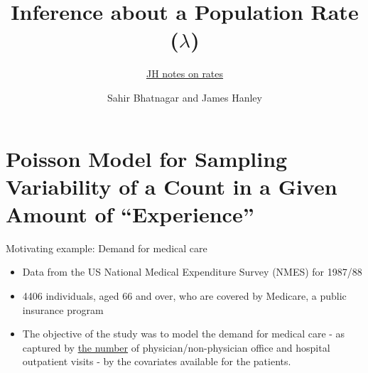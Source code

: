 \documentclass{beamer}\usepackage[]{graphicx}\usepackage[]{color}
\begin{document}




\title{Inference about a Population Rate ($\lambda$)}
\subtitle{\href{https://www.dropbox.com/s/b5q7vqo2ev6k2me/EPIB607intensity-model-inference-plan-2018.pdf?dl=0}{JH notes on rates}}
\author{Sahir Bhatnagar and James Hanley}


\maketitle

\section{Poisson Model for Sampling Variability of a Count in a Given Amount of ``Experience''}

\begin{frame}{Motivating example: Demand for medical care}

\begin{itemize}
	\setlength\itemsep{1em}
	\item Data from the US National Medical	Expenditure Survey (NMES) for 1987/88
	\item 4406 individuals, aged 66 and over, who are covered by Medicare, a public insurance program
	\item The objective of the study was to model the demand for medical care - as captured by \underline{the number} of physician/non-physician office and hospital outpatient visits - by the covariates available for the patients.
\end{itemize}

\end{frame}
\end{document}
